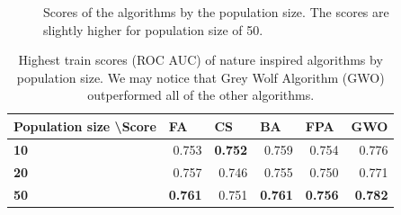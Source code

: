\documentclass[runningheads]{llncs}
\begin{document}
\begin{figure}
    \centering
    \qquad
    \caption{Scores of the algorithms by the population size. The scores are slightly higher for population size of 50.}
    \label{fig:nia_train_score_by_algorithm}
\end{figure}

\def\arraystretch{1.5}
\begin{table}[]
	\begin{center}
		\begin{tabular}{|l|r|r|r|r|r|}
			\hline
			\textbf{Population size \textbackslash Score} & \multicolumn{1}{l|}{\textbf{FA}} & \multicolumn{1}{l|}{\textbf{CS}} & \multicolumn{1}{l|}{\textbf{BA}} & \multicolumn{1}{l|}{\textbf{FPA}} & \multicolumn{1}{l|}{\textbf{GWO}} \\ \hline
			\textbf{10}                                             & 0.753                           & \textbf{0.752}                           & 0.759                           & 0.754                            & 0.776                             \\
			\textbf{20}                                             & 0.757                           & 0.746                           & 0.755                           & 0.750                            & 0.771                             \\
			\textbf{50}                                             & \textbf{0.761}                           & 0.751                           & \textbf{0.761}                           & \textbf{0.756}                            & \textbf{0.782}                             \\ \hline
		\end{tabular}
	\end{center}
	\begin{center}
		\caption{Highest train scores (ROC AUC) of nature inspired algorithms by population size. We may notice that Grey Wolf Algorithm (GWO) outperformed all of the other algorithms.} \label{tab:nia_comparison}
	\end{center}
\end{table}
\end{document}
